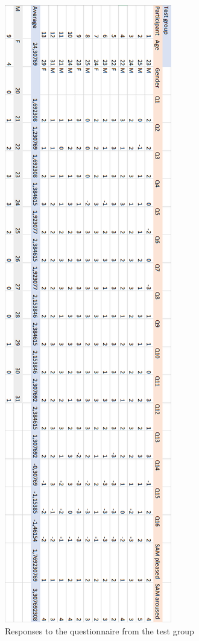 \begin{figure}[h!]
    \centering
    \includegraphics[scale=0.65]{figures/questionnaire_results_test.png}
    \caption{Responses to the questionnaire from the test group}\label{fig:responses_test}
\end{figure}